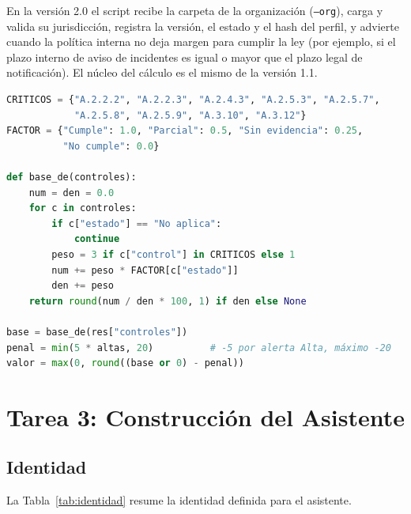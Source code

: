 \documentclass[12pt,letterpaper]{article}
\begin{document}
En la versión 2.0 el script recibe la carpeta de la organización (\texttt{--org}), carga y valida su jurisdicción, registra la versión, el estado y el hash del perfil, y advierte cuando la política interna no deja margen para cumplir la ley (por ejemplo, si el plazo interno de aviso de incidentes es igual o mayor que el plazo legal de notificación). El núcleo del cálculo es el mismo de la versión 1.1.

\begin{lstlisting}[style=codigo, language=Python, caption={Cálculo del puntaje del proveedor (extracto de \texttt{calcular\_resultado.py})}, label={lst:puntaje}]
CRITICOS = {"A.2.2.2", "A.2.2.3", "A.2.4.3", "A.2.5.3", "A.2.5.7",
            "A.2.5.8", "A.2.5.9", "A.3.10", "A.3.12"}
FACTOR = {"Cumple": 1.0, "Parcial": 0.5, "Sin evidencia": 0.25,
          "No cumple": 0.0}

def base_de(controles):
    num = den = 0.0
    for c in controles:
        if c["estado"] == "No aplica":
            continue
        peso = 3 if c["control"] in CRITICOS else 1
        num += peso * FACTOR[c["estado"]]
        den += peso
    return round(num / den * 100, 1) if den else None

base = base_de(res["controles"])
penal = min(5 * altas, 20)          # -5 por alerta Alta, máximo -20
valor = max(0, round((base or 0) - penal))
\end{lstlisting}

\section{Tarea 3: Construcción del Asistente}
\label{sec:asistente}

\subsection{Identidad}

La Tabla~\ref{tab:identidad} resume la identidad definida para el asistente.
\end{document}
